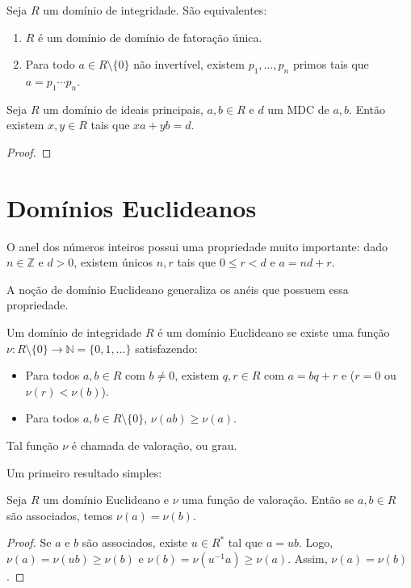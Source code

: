 \begin{prop}
Seja $R$ um domínio de integridade.
São equivalentes:
\begin{enumerate}[label=\alph*)]
    \item $R$ é um domínio de domínio de fatoração única.
    \item Para todo $a\in R\setminus \{0\}$ não invertível, existem $p_1, \dots, p_n$ primos tais que $a=p_1\cdots p_n$.
\end{enumerate}
\end{prop}
\begin{prop}
    Seja $R$ um domínio de ideais principais, $a, b \in R$ e $d$ um MDC de $a, b$.
    Então existem $x, y \in R$ tais que $xa+yb=d$.
\end{prop}
\begin{proof}

\end{proof}
\section{Domínios Euclideanos}
O anel dos números inteiros possui uma propriedade muito importante:
dado $n\in \mathbb Z$ e $d>0$, existem únicos $n, r$ tais que $0\leq r < d$ e $a=nd+r$.

A noção de domínio Euclideano generaliza os anéis que possuem essa propriedade.

\begin{definition}
    Um domínio de integridade $R$ é um domínio Euclideano
    se existe uma função $\nu:R\setminus \{0\} \to \mathbb N=\{0, 1, \dots\}$ satisfazendo:
    \begin{itemize}
        \item Para todos $a, b \in R$ com $b\neq 0$, existem $q, r \in R$ com $a=bq+r$ e ($r=0$ ou $\nu(r)<\nu(b)$).
        \item Para todos $a, b \in R\setminus \{0\}$, $\nu(ab)\geq \nu(a)$.
    \end{itemize}

    Tal função $\nu$ é chamada de valoração, ou grau.
\end{definition}
Um primeiro resultado simples:
\begin{definition}
    Seja $R$ um domínio Euclideano e $\nu$ uma função de valoração.
    Então se $a, b \in R$ são associados, temos $\nu(a)=\nu(b)$.
\end{definition}
\begin{proof}
    Se $a$ e $b$ são associados, existe $u \in R^*$ tal que $a=ub$.
    Logo, $\nu(a)=\nu(ub)\geq \nu(b)$ e $\nu(b)=\nu(u^{-1}a)\geq \nu(a)$.
    Assim, $\nu(a)=\nu(b)$.
\end{proof}

